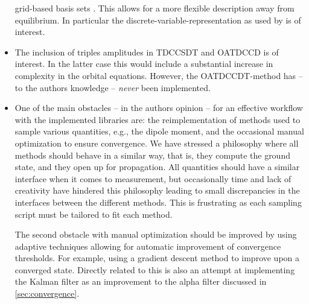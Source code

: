 \begin{itemize}
                    grid-based basis sets \cite{takeshi, miyagi_and_madsen,
                    hochstuhl2014time}.
                    This allows for a more flexible description away from
                    equilibrium.
                    In particular the discrete-variable-representation as used
                    by \citeauthor{miyagi_and_madsen} \cite{miyagi_and_madsen}
                    is of interest.
                \item The inclusion of triples amplitudes in TDCCSDT and OATDCCD
                    is of interest.
                    In the latter case this would include a substantial
                    increase in complexity in the orbital equations.
                    However, the OATDCCDT-method has -- to the authors knowledge
                    -- \emph{never} been implemented.
                \item One of the main obstacles -- in the authors opinion -- for
                    an effective workflow with the implemented libraries are: the
                    reimplementation of methods used to sample various
                    quantities, e.g., the dipole moment, and the occasional
                    manual optimization to ensure convergence.
                    We have stressed a philosophy where all methods should behave
                    in a similar way, that is, they compute the ground state,
                    and they open up for propagation.
                    All quantities should have a similar interface when it comes
                    to measurement, but occasionally time and lack of creativity
                    have hindered this philosophy leading to small discrepancies
                    in the interfaces between the different methods.
                    This is frustrating as each sampling script must be tailored
                    to fit each method.

                    The second obstacle with manual optimization should be
                    improved by using adaptive techniques allowing for automatic
                    improvement of convergence thresholds.
                    For example, using a gradient descent method to improve upon
                    a converged state.
                    Directly related to this is also an attempt at implementing
                    the Kalman filter as an improvement to the alpha filter
                    discussed in \autoref{sec:convergence}.
            \end{itemize}

